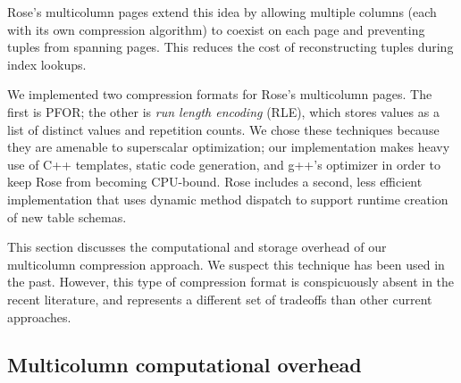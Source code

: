 \documentclass{vldb}
\newcommand{\rows}{Rose\xspace}
\newcommand{\rowss}{Rose's\xspace}
\begin{document}
\rowss multicolumn pages extend this idea by allowing multiple columns
(each with its own compression algorithm) to coexist on each page and preventing tuples from spanning pages.
This reduces the cost of reconstructing tuples during index lookups.

We implemented two compression formats for \rowss multicolumn pages.
The first is PFOR; the other is {\em run length encoding} (RLE), which
stores values as a list of distinct values and repetition counts.  We
chose these techniques because they are amenable to superscalar
optimization; our implementation makes heavy use of C++
templates, static code generation, and g++'s optimizer in order to
keep \rows from becoming CPU-bound.  \rows includes a second, less
efficient implementation that uses dynamic method dispatch to support
runtime creation of new table schemas.

This section discusses the computational and storage overhead of our
multicolumn compression approach.  We suspect this technique has been
used in the past.  However, this type of compression format is
conspicuously absent in the recent literature, and represents a
different set of tradeoffs than other current approaches.

\subsection{Multicolumn computational overhead}



\end{document}
